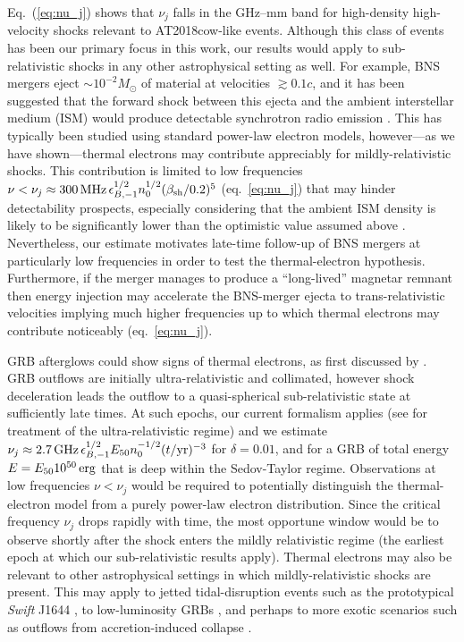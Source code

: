 \documentclass[twocolumn]{aastex63}
\begin{document}
Eq.~(\ref{eq:nu_j}) shows that $\nu_j$ falls in the GHz--mm band for high-density high-velocity shocks relevant to AT2018cow-like events.
Although this class of events has been our primary focus in this work, our results would apply to sub-relativistic shocks in any other astrophysical setting as well.
For example, BNS mergers eject $\sim 10^{-2}M_\odot$ of material at velocities $\gtrsim 0.1 c$, and it has been suggested that the forward shock between this ejecta and the ambient interstellar medium (ISM) would produce detectable synchrotron radio emission \citep[e.g.][]{Nakar&Piran11,Margalit&Piran15,Margalit&Piran20,Hajela+21}. This has typically been studied using standard power-law electron models, however---as we have shown---thermal electrons may contribute appreciably for mildly-relativistic shocks. 
This contribution is limited to low frequencies 
$\nu < \nu_j \approx 300\,{\rm MHz}\,\epsilon_{B,-1}^{1/2} n_0^{1/2} (\beta_{\rm sh}/0.2)^5$ (eq.~\ref{eq:nu_j}) that may hinder detectability prospects, especially considering that the ambient ISM density is likely to be significantly lower than the optimistic value assumed above \citep[e.g.][]{Fong+15,Hajela+19}. Nevertheless, our estimate motivates late-time follow-up of BNS mergers at particularly low frequencies in order to test the thermal-electron hypothesis.
Furthermore, if the merger manages to produce a ``long-lived'' magnetar remnant then energy injection may accelerate the BNS-merger ejecta to trans-relativistic velocities \citep{Metzger&Bower14,Horesh+16,Fong+16,Margalit&Metzger19,Schroeder+20} implying much higher frequencies up to which thermal electrons may contribute noticeably (eq.~\ref{eq:nu_j}).


GRB afterglows could show signs of thermal electrons,
as first discussed by \cite{Giannios&Spitkovsky09}. GRB outflows are initially ultra-relativistic and collimated, however shock deceleration leads the outflow to a quasi-spherical sub-relativistic state at sufficiently late times. At such epochs, our current formalism applies (see \citealt{Ressler&Laskar17} for treatment of the ultra-relativistic regime) and we estimate
$\nu_j \approx 2.7\,{\rm GHz}\,\epsilon_{B,-1}^{1/2} E_{50} n_0^{-1/2} (t/{\rm yr})^{-3}$
for $\delta=0.01$, and for a GRB of total energy $E=E_{50}10^{50}\,{\rm erg}$ that is deep within the Sedov-Taylor regime. Observations at low frequencies $\nu < \nu_j$ would be required to potentially distinguish the thermal-electron model from a purely power-law electron distribution. Since the critical frequency $\nu_j$ drops rapidly with time, the most opportune window would be to observe shortly after the shock enters the mildly relativistic regime (the earliest epoch at which our sub-relativistic results apply).
Thermal electrons may also be relevant to other astrophysical settings in which mildly-relativistic shocks are present. This may apply to jetted tidal-disruption events such as the prototypical {\it Swift} J1644 \citep{Bloom+11,Burrows+11,Zauderer+11,Eftekhari+18}, to low-luminosity GRBs \citep[e.g.][]{Kulkarni+98,Tan+01,BarniolDuran+15}, and perhaps to more exotic scenarios such as outflows from accretion-induced collapse \citep[e.g.][]{Dessart+06,Darbha+10}.
\end{document}
